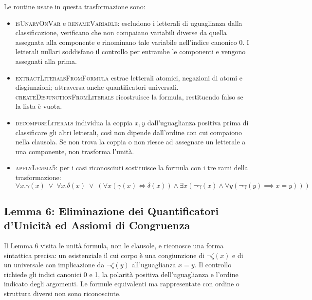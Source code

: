 Le routine usate in questa trasformazione sono:
\begin{itemize}
    \item \textsc{isUnaryOnVar} e \textsc{renameVariable}: escludono i letterali di uguaglianza dalla classificazione, verificano che non compaiano variabili diverse da quella assegnata alla componente e rinominano tale variabile nell'indice canonico 0. I letterali nullari soddisfano il controllo per entrambe le componenti e vengono assegnati alla prima.
    
    \item \textsc{extractLiteralsFromFormula} estrae letterali atomici, negazioni di atomi e disgiunzioni; attraversa anche quantificatori universali. \textsc{createDisjunctionFromLiterals} ricostruisce la formula, restituendo falso se la lista è vuota.
    
    \item \textsc{decomposeLiterals} individua la coppia $x,y$ dall'uguaglianza positiva prima di classificare gli altri letterali, così non dipende dall'ordine con cui compaiono nella clausola. Se non trova la coppia o non riesce ad assegnare un letterale a una componente, non trasforma l'unità.
    
    \item \textsc{applyLemma5}: per i casi riconosciuti sostituisce la formula con i tre rami della trasformazione:
    $$\forall x . \gamma(x) \;\lor\; \forall x . \delta(x) \;\lor\; \left( \forall x (\gamma(x) \iff \delta(x)) \land \exists x (\neg \gamma(x) \land \forall y (\neg \gamma(y) \implies x = y)) \right)$$
\end{itemize}




\subsection{Lemma 6: Eliminazione dei Quantificatori d'Unicità ed Assiomi di Congruenza}
\label{subsec:lemma6_impl}

Il Lemma 6 visita le unità formula, non le clausole, e riconosce una forma sintattica precisa: un esistenziale il cui corpo è una congiunzione di $\neg\zeta(x)$ e di un universale con implicazione da $\neg\zeta(y)$ all'uguaglianza $x=y$. Il controllo richiede gli indici canonici 0 e 1, la polarità positiva dell'uguaglianza e l'ordine indicato degli argomenti. Le formule equivalenti ma rappresentate con ordine o struttura diversi non sono riconosciute.

